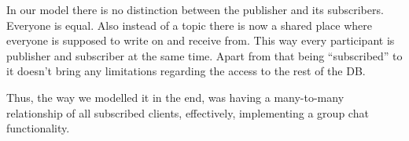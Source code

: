 In our model there is no distinction between the publisher and its subscribers. Everyone is equal. Also instead of a topic there is now a shared place where everyone is supposed to write on and receive from. This way every participant is publisher and subscriber at the same time. Apart from that being “subscribed” to it doesn’t bring any limitations regarding the access to the rest of the DB. 

Thus, the way we modelled it in the end, was having a many-to-many relationship of all subscribed clients, effectively, implementing a group chat functionality.


